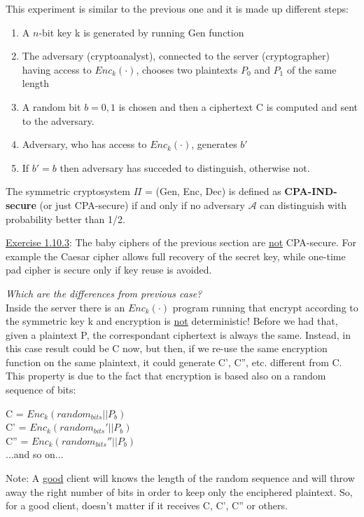 \documentclass{article}
\begin{document}
This experiment is similar to the previous one and it is made up different steps:
\begin{enumerate}
    \item A $n$-bit key k is generated by running Gen function
    \item The adversary (cryptoanalyst), connected to the server (cryptographer) having access to $Enc_k(\cdot)$, chooses two plaintexts $P_0$ and $P_1$ of the same length
    \item A random bit $b = {0,1}$ is chosen and then a ciphertext C is computed and sent to the adversary.
    \item Adversary, who has access to $Enc_k(\cdot)$, generates $b'$
    \item If $b' = b$ then adversary has succeded to distinguish, otherwise not.
\end{enumerate}

The symmetric cryptosystem $\Pi$ = (Gen, Enc, Dec) is defined as \textbf{CPA-IND-secure} (or just CPA-secure) if and only if no adversary $\mathcal{A}$ can distinguish with probability better than 1/2.

\underline{Exercise 1.10.3}: The baby ciphers of the previous section are \underline{not} CPA-secure. For example the Caesar cipher allows full recovery of the secret key, while one-time pad cipher is secure only if key reuse is avoided.

\textit{Which are the differences from previous case?}\\
Inside the server there is an $Enc_k(\cdot)$ program running that encrypt according to the symmetric key k and encryption is \underline{not} deterministic! 
Before we had that, given a plaintext P, the correspondant ciphertext is always the same. Instead, in this case result could be C now, but then, if we re-use the same encryption function on the same plaintext, it could generate C', C'', etc. different from C. This property is due to the fact that encryption is based also on a random sequence of bits:
\begin{center}
    C = $Enc_k(random_{bits} || P_b)$\\
    C' = $Enc_k(random_{bits}' || P_b)$\\
    C'' = $Enc_k(random_{bits}'' || P_b)$\\
    ...and so on...
\end{center}

Note: A \underline{good} client will knows the length of the random sequence and will throw away the right number of bits in order to keep only the enciphered plaintext. So, for a good client, doesn't matter if it receives C, C', C'' or others.
\end{document}
